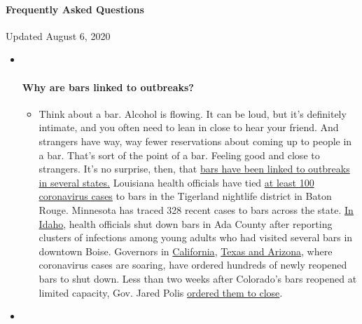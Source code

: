 \hypertarget{frequently-asked-questions}{%
\paragraph{Frequently Asked
Questions}\label{frequently-asked-questions}}

Updated August 6, 2020

\begin{itemize}
\item ~
  \hypertarget{why-are-bars-linked-to-outbreaks}{%
  \paragraph{Why are bars linked to
  outbreaks?}\label{why-are-bars-linked-to-outbreaks}}

  \begin{itemize}
  \tightlist
  \item
    Think about a bar. Alcohol is flowing. It can be loud, but it's
    definitely intimate, and you often need to lean in close to hear
    your friend. And strangers have way, way fewer reservations about
    coming up to people in a bar. That's sort of the point of a bar.
    Feeling good and close to strangers. It's no surprise, then, that
    \href{https://www.nytimes.com/2020/07/02/us/coronavirus-bars.html?action=click\&pgtype=Article\&state=default\&region=MAIN_CONTENT_3\&context=storylines_faq}{bars
    have been linked to outbreaks in several states.} Louisiana health
    officials have tied
    \href{https://www.nytimes.com/2020/06/22/us/new-coronavirus-phase.html?action=click\&pgtype=Article\&state=default\&region=MAIN_CONTENT_3\&context=storylines_faq}{at
    least 100 coronavirus cases} to bars in the Tigerland nightlife
    district in Baton Rouge. Minnesota has traced 328 recent cases to
    bars across the state.
    \href{https://www.boisestatepublicradio.org/post/bars-large-venues-close-ada-county-after-surge-coronavirus-prompts-rollback\#stream/0}{In
    Idaho}, health officials shut down bars in Ada County after
    reporting clusters of infections among young adults who had visited
    several bars in downtown Boise. Governors in
    \href{https://www.nytimes.com/2020/07/01/us/california-coronavirus-reopening.html?action=click\&pgtype=Article\&state=default\&region=MAIN_CONTENT_3\&context=storylines_faq}{California},
    \href{https://www.nytimes.com/2020/06/14/us/coronavirus-united-states.html?action=click\&pgtype=Article\&state=default\&region=MAIN_CONTENT_3\&context=storylines_faq}{Texas
    and Arizona}, where coronavirus cases are soaring, have ordered
    hundreds of newly reopened bars to shut down. Less than two weeks
    after Colorado's bars reopened at limited capacity, Gov. Jared Polis
    \href{https://www.denverpost.com/2020/06/30/colorado-bars-closed-coronavirus/}{ordered
    them to close}.
  \end{itemize}
\item ~
  \hypertarget{i-have-antibodies-am-i-now-immune}{%
}
\end{itemize}
